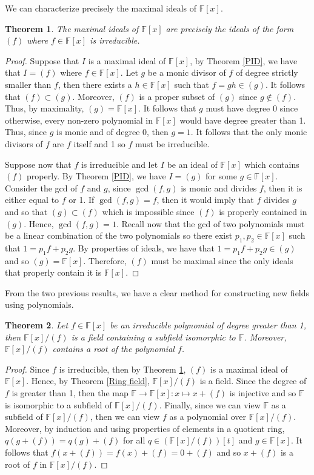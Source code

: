 \documentclass{article}
\theoremstyle{plain}
\newtheorem{theorem}{Theorem}[subsection]
\theoremstyle{definition}
\newcommand{\F}{\mathbb{F}}
\begin{document}
We can characterize precisely the maximal ideals of $\F[x]$.

\begin{theorem}
\label{maximal_ideal}
    The maximal ideals of $\F[x]$ are precisely the ideals of the form $(f)$ where $f\in \F[x]$ is irreducible.
\end{theorem}

\begin{proof}
    Suppose that $I$ is a maximal ideal of $\F[x]$, by Theorem \ref{PID}, we have that $I = (f)$ where $f \in \F[x]$. Let $g$ be a monic divisor of $f$ of degree strictly smaller than $f$, then there exists a $h \in \F[x]$ such that $f = gh \in (g)$. It follows that $(f) \subset (g)$. Moreover, $(f)$ is a proper subset of $(g)$ since $g \notin (f)$. Thus, by maximality, $(g) = \F[x]$. It follows that $g$ must have degree 0 since otherwise, every non-zero polynomial in $\F[x]$ would have degree greater than 1. Thus, since $g$ is monic and of degree 0, then $g = 1$. It follows that the only monic divisors of $f$ are $f$ itself and 1 so $f$ must be irreducible.
    
    Suppose now that $f$ is irreducible and let $I$ be an ideal of $\F[x]$ which contains $(f)$ properly. By Theorem \ref{PID}, we have $I = (g)$ for some $g \in \F[x]$. Consider the gcd of $f$ and $g$, since $\gcd(f,g)$ is monic and divides $f$, then it is either equal to $f$ or 1. If $\gcd(f,g) = f$, then it would imply that $f$ divides $g$ and so that $(g) \subset (f)$ which is impossible since $(f)$ is properly contained in $(g)$. Hence, $\gcd(f,g) = 1$. Recall now that the gcd of two polynomials must be a linear combination of the two polynomials so there exist $p_1, p_2 \in \F[x]$ such that $1 = p_1 f + p_2 g$. By properties of ideals, we have that $1 = p_1 f + p_2 g \in (g)$ and so $(g) = \F[x]$. Therefore, $(f)$ must be maximal since the only ideals that properly contain it is $\F[x]$. 
\end{proof}

From the two previous results, we have a clear method for constructing new fields using polynomials.

\begin{theorem}
    Let $f \in \F[x]$ be an irreducible polynomial of degree greater than 1, then $\F[x]/(f)$ is a field containing a subfield isomorphic to $\F$. Moreover, $\F[x]/(f)$ contains a root of the polynomial $f$.
\end{theorem}

\begin{proof}
    Since $f$ is irreducible, then by Theorem \ref{maximal_ideal}, $(f)$ is a maximal ideal of $\F[x]$. Hence, by Theorem \ref{Ring field}, $\F[x]/(f)$ is a field. Since the degree of $f$ is greater than 1, then the map $\F \to \F[x] : x \mapsto x + (f)$ is injective and so $\F$ is isomorphic to a subfield of $\F[x]/(f)$. Finally, since we can view $\F$ as a subfield of $\F[x]/(f)$, then we can view $f$ as a polynomial over $\F[x]/(f)$. Moreover, by induction and using properties of elements in a quotient ring, $q(g + (f)) = q(g) + (f)$ for all $q \in (\F[x]/(f))[t]$ and $g \in \F[x]$. It follows that $f(x + (f)) = f(x) + (f) = 0 + (f)$ and so $x + (f)$ is a root of $f$ in $\F[x]/(f)$.
\end{proof}
\end{document}
